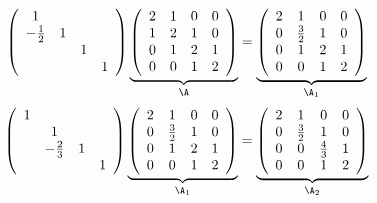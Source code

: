\begin{frame}\ft{\secname}
\begin{small}
\begin{jie}
  $$
   \left(
  \begin{array}{cccc}
  1 & && \\
  -\frac12 &1&&\\
  &&1&\\
  &&&1
  \end{array}
  \right)\underbrace{\left(
  \begin{array}{cccc}
  2 & 1 & 0 & 0\\
  1 & 2 & 1 & 0\\
  0 & 1 & 2 & 1\\
  0 & 0 & 1 & 2
  \end{array}
  \right)}_{\A}=  \underbrace{\left(
  \begin{array}{cccc}
  2 & 1 & 0 & 0\\
  0 & \frac32 & 1 & 0\\
  0 & 1 & 2 & 1\\
  0 & 0 & 1 & 2
  \end{array}
  \right)}_{\A_1}
  $$
\pause
  $$
  \left(
    \begin{array}{cccc}
      1 & && \\
        &1&&\\
        &-\frac23&1&\\
        &&&1
    \end{array}
  \right)\underbrace{\left(
  	\begin{array}{cccc}
  	2 & 1 & 0 & 0\\
  	0 & \frac32 & 1 & 0\\
  	0 & 1 & 2 & 1\\
  	0 & 0 & 1 & 2
  	\end{array}
  	\right)}_{\A_1} = \underbrace{\left(
    \begin{array}{cccc}
      2 & 1 & 0 & 0\\
      0 & \frac32 & 1 & 0\\
      0 & 0 & \frac43 & 1\\
      0 & 0 & 1 & 2
    \end{array}
  \right)}_{\A_2}
  $$
\pause


\end{jie}
\end{small}
\end{frame}
